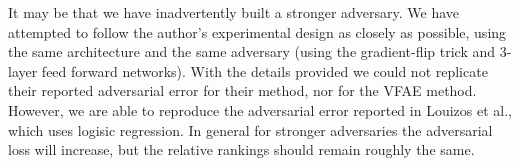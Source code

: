 It may be that we have inadvertently built a stronger adversary. We have attempted to follow the author's experimental design as closely as possible, using the same architecture and the same adversary (using the gradient-flip trick and 3-layer feed forward networks).
With the details provided we could not replicate their reported adversarial error for their method, nor for the VFAE method. However, we are able to reproduce the adversarial error reported in Louizos et al., which uses logisic regression. In general for stronger adversaries the adversarial loss will increase, but the relative rankings should remain roughly the same.








